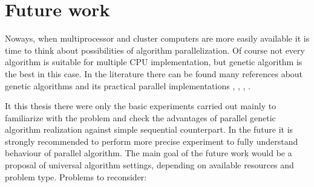 \section{Future work}
\label{cha:FutureWork}
Noways, when multiprocessor and cluster computers are more easily available it
is time to think about possibilities of algorithm parallelization. Of course not every
algorithm is suitable for multiple CPU implementation, but genetic algorithm is
the best in this case. In the literature there can be found many references
about genetic algorithms and its practical parallel implementations
\cite{bib2}, \cite{bib8}, \cite{bib9}, \cite{bib17}. 

It this thesis there were only the basic experiments carried out mainly to
familiarize with the problem and check the advantages of parallel genetic
algorithm realization against simple sequential counterpart. In the future it is strongly recommended to
perform more precise experiment to fully understand behaviour of parallel
algorithm. The main goal of the future work would be a proposal of universal 
algorithm settings, depending on available
resources and problem type. Problems to reconsider:
